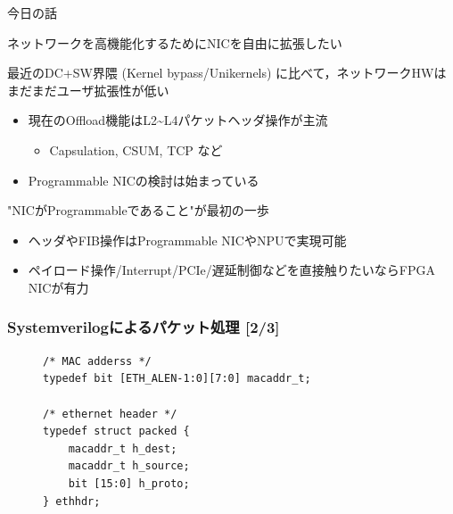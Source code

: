\documentclass[10pt, compress]{beamer}
\begin{document}
\begin{frame}[fragile,t]{今日の話}

ネットワークを高機能化するためにNICを自由に拡張したい
\vspace{.5em}

最近のDC+SW界隈 (Kernel bypass/Unikernels) に比べて，ネットワークHWはまだまだユーザ拡張性が低い
\vspace{-.5em}
\begin{itemize}
\item 現在のOffload機能はL2\~{}L4パケットヘッダ操作が主流
    \begin{itemize}
        \item Capsulation, CSUM, TCP など
    \end{itemize}
\item Programmable NICの検討は始まっている
\end{itemize}
\vspace{.5em}

"NICがProgrammableであること"が最初の一歩
\vspace{-.5em}
\begin{itemize}
\item ヘッダやFIB操作はProgrammable NICやNPUで実現可能
\item ペイロード操作/Interrupt/PCIe/遅延制御などを直接触りたいならFPGA NICが有力
\end{itemize}

\end{frame}


\begin{frame}[fragile,t]
  \frametitle{Systemverilogによるパケット処理 [2/3]}

\begin{figure}
\begin{tcolorbox}[title=ethernet\_pkg.sv]
\begin{verbatim}
/* MAC adderss */
typedef bit [ETH_ALEN-1:0][7:0] macaddr_t;

/* ethernet header */
typedef struct packed {
    macaddr_t h_dest;
    macaddr_t h_source;
    bit [15:0] h_proto;
} ethhdr;
\end{verbatim}
\end{tcolorbox}
\end{figure}

\end{frame}

\end{document}
